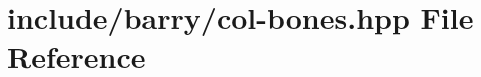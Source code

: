 \hypertarget{col-bones_8hpp}{}\section{include/barry/col-\/bones.hpp File Reference}
\label{col-bones_8hpp}
